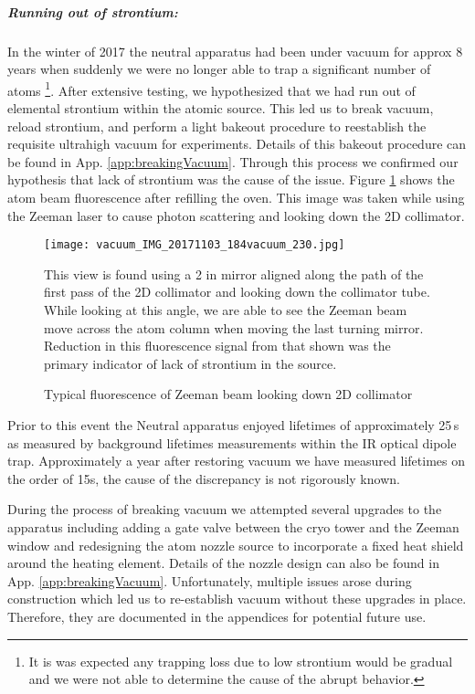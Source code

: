 \subparagraph{Running out of strontium:}
In the winter of 2017 the neutral apparatus had been under vacuum for approx 8 years when suddenly we were no longer able to trap a significant number of atoms \footnote{It is was expected any trapping loss due to low strontium would be gradual and we were not able to determine the cause of the abrupt behavior.}.
After extensive testing, we hypothesized that we had run out of elemental strontium within the atomic source.
This led us to break vacuum, reload strontium, and perform a light bakeout procedure to reestablish the requisite ultrahigh vacuum for experiments.
Details of this bakeout procedure can be found in App. \ref{app:breakingVacuum}. 
Through this process we confirmed our hypothesis that lack of strontium was the cause of the issue. 
Figure \ref{fig:2d_coll_flourescence} shows the atom beam fluorescence after refilling the oven.
This image was taken while using the Zeeman laser to cause photon scattering and looking down the 2D collimator.
	\begin{figure}
		\centerline{
		\texttt{[image: vacuum\_IMG\_20171103\_184vacuum\_230.jpg]}}
		\caption{Typical fluorescence of Zeeman beam looking down 2D collimator}{This view is found using a 2 in mirror aligned along the path of the first pass of the 2D collimator and looking down the collimator tube. While looking at this angle, we are able to see the Zeeman beam move across the atom column when moving the last turning mirror. Reduction in this fluorescence signal from that shown was the primary indicator of lack of strontium in the source.}
		\label{fig:2d_coll_flourescence}
	\end{figure}  
Prior to this event the Neutral apparatus enjoyed lifetimes of approximately 25\,s as measured by background lifetimes measurements within the IR optical dipole trap. 
Approximately a year after restoring vacuum we have measured lifetimes on the order of 15s, the cause of the discrepancy is not rigorously known.

During the process of breaking vacuum we attempted several upgrades to the apparatus including adding a gate valve between the cryo tower and the Zeeman window and redesigning the atom nozzle source to incorporate a fixed heat shield around the heating element. 
Details of the nozzle design can also be found in App. \ref{app:breakingVacuum}.
Unfortunately, multiple issues arose during construction which led us to re-establish vacuum without these upgrades in place.
Therefore, they are documented in the appendices for potential future use.

